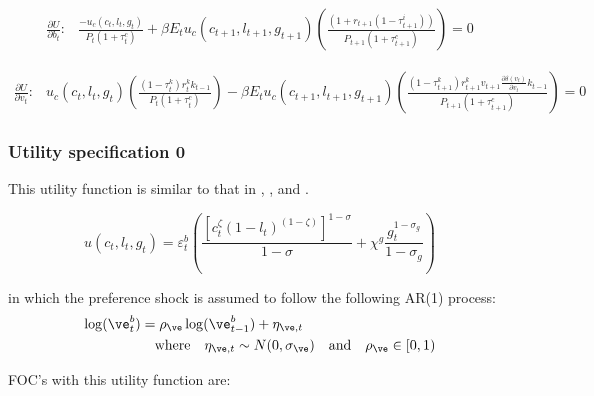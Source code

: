 \begin{equation}
\begin{split}
\frac{\partial U}{\partial b_{t}}: & \frac{-u_{c}(c_{t},l_{t},g_{t})}{P_{t}(1+\tau_{t}^{c})}  +
\beta E_{t}u_{c}(c_{t+1},l_{t+1},g_{t+1})\left(\frac{(1+r_{t+1}(1-\tau_{t+1}^{i}))}{P_{t+1}(1+\tau_{t+1}^{c})}\right)  = 0
\end{split}
\end{equation}

\begin{equation}
\begin{split}
\frac{\partial U}{\partial v_{t}}: & u_{c}(c_{t},l_{t},g_{t})\left(\frac{(1-\tau_{t}^{k})r_{t}^{k}k_{t-1}}{P_{t}(1+\tau_{t}^{c})}\right) - \beta E_{t}u_{c}(c_{t+1},l_{t+1},g_{t+1})\left(\frac{(1-\tau_{t+1}^{k})r_{t+1}^{k}v_{t+1}\frac{\partial \delta(v_{t})}{\partial v_{t}}k_{t-1}}{P_{t+1}(1+\tau_{t+1}^{c})}\right)  = 0
\end{split}
\end{equation}


\subsubsection{Utility specification 0}

This utility function is similar to that in , , and .

\begin{equation}
u(c_{t},l_{t},g_{t})= \varepsilon_{t}^{b}\left(\frac{[c_{t}^{\zeta}(1-l_{t})^{(1-\zeta)}]^{1-\sigma}}{1-\sigma}+\chi^{g}\frac{g_{t}^{1-\sigma_{g}}}{1-\sigma_{g}}\right)
\end{equation}

in which the preference shock is assumed to follow the following AR(1) process:
\begin{equation}\label{EqPrefShock}
   \begin{split}
      \log(\ve_t^b) &= \rho_\ve \log(\ve_{t-1}^b) + \eta_{\ve,t} \\
      &\quad\text{where}\quad\eta_{\ve,t}\sim N(0,\sigma_\ve) \quad\text{and}\quad \rho_\ve\in[0,1)
   \end{split}
\end{equation}

FOC's with this utility function are:



